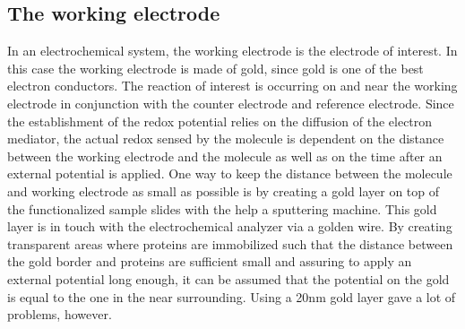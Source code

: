 \documentclass[twoside,single]{lion-msc}
\begin{document}
\subsection{The working electrode}
In an electrochemical system, the working electrode is the electrode of interest. In this case the working electrode is made of gold, since gold is one of the best electron conductors. The reaction of interest is occurring on and near the working electrode in conjunction with the counter electrode and reference electrode. Since the establishment of the redox potential relies on the diffusion of the electron mediator, the actual redox sensed by the molecule is dependent on the distance between the working electrode and the molecule as well as on the time after an external potential is applied. One way to keep the distance between the molecule and working electrode as small as possible is by creating a gold layer on top of the functionalized sample slides with the help a sputtering machine. This gold layer is in touch with the electrochemical analyzer via a  golden wire.  By creating transparent areas where proteins are immobilized such that the distance between the gold border and proteins are sufficient small and assuring to apply an external potential long enough, it can be assumed that the potential on the gold is equal to the one in the near surrounding. Using a 20nm gold layer gave a lot of problems, however. 
\end{document}
